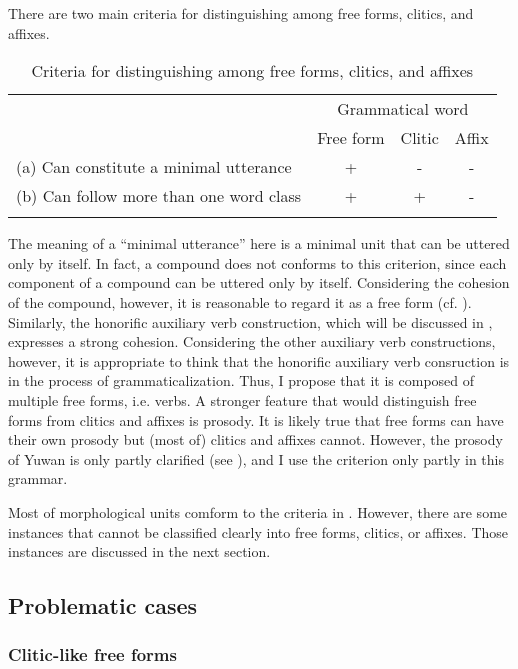 There are two main criteria for distinguishing among free forms, clitics, and affixes.

\begin{table}
\caption{\label{tab:24}Criteria for distinguishing among free forms, clitics, and affixes}
\begin{tabularx}{\textwidth}{Xccc}
\lsptoprule
& \multicolumn{3}{c}{Grammatical word}\\
& Free form  & Clitic &  Affix\\\midrule
(a) Can constitute a minimal utterance  & +  & {}- &  {}-\\
(b) Can follow more than one word class & +  & +   & {}- \\
\lspbottomrule
\end{tabularx}
\end{table}

The meaning of a “minimal utterance” here is a minimal unit that can be uttered only by itself. In fact, a compound does not conforms to this criterion, since each component of a compound can be uttered only by itself. Considering the cohesion of the compound, however, it is reasonable to regard it as a free form (cf. \citealt{DixonAikhenvald2002}). Similarly, the honorific auxiliary verb construction, which will be discussed in , expresses a strong cohesion. Considering the other auxiliary verb constructions, however, it is appropriate to think that the honorific auxiliary verb consruction is in the process of grammaticalization. Thus, I propose that it is composed of multiple free forms, i.e. verbs. A stronger feature that would distinguish free forms from clitics and affixes is prosody. It is likely true that free forms can have their own prosody but (most of) clitics and affixes cannot. However, the prosody of Yuwan is only partly clarified (see ), and I use the criterion only partly in this grammar.

  Most of morphological units comform to the criteria in . However, there are some instances that cannot be classified clearly into free forms, clitics, or affixes. Those instances are discussed in the next section.

\subsection{Problematic cases}\label{sec:4.2.2}
\subsubsection{Clitic-like free forms}\label{sec:4.2.2.1}

